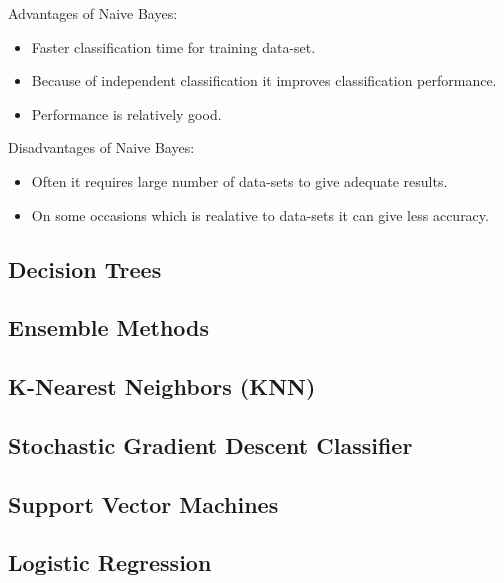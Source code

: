 \documentclass[sigconf]{acmart}
\begin{document}
Advantages of Naive Bayes:
\begin{itemize}
\item Faster classification time for training data-set.
\item Because of independent classification it improves classification performance.
\item Performance is relatively good. 
\end{itemize}

Disadvantages of Naive Bayes:

\begin{itemize}
\item Often it requires large number of data-sets to give adequate results.
\item On some occasions which is realative to data-sets it can give less accuracy.
\end{itemize}

\subsection{Decision Trees}



\subsection{Ensemble Methods}



\subsection{K-Nearest Neighbors (KNN)}



\subsection{Stochastic Gradient Descent Classifier}



\subsection{Support Vector Machines}
 


\subsection{Logistic Regression}
\end{document}
